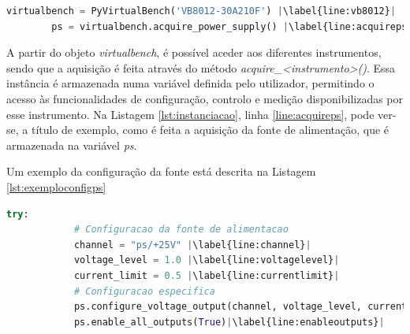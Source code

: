 \begin{center}
\begin{minipage}{0.9\linewidth}
	\begin{lstlisting}[language=Python,escapechar=|, caption=Instanciação da classe \textit{PyVirtualBench}, label=lst:instanciacao]
		virtualbench = PyVirtualBench('VB8012-30A210F') |\label{line:vb8012}|
		ps = virtualbench.acquire_power_supply() |\label{line:acquireps}|
	\end{lstlisting}
\end{minipage}
\end{center}

A partir do objeto \textit{virtualbench}, é possível aceder aos diferentes instrumentos, sendo que a aquisição é feita através do método \textit{acquire\_\textless instrumento\textgreater()}. Essa instância é armazenada numa variável definida pelo utilizador, permitindo o acesso às funcionalidades de configuração, controlo e medição disponibilizadas por esse instrumento. Na Listagem \ref{lst:instanciacao}, linha \ref{line:acquireps}, pode ver-se, a título de exemplo, como é feita a aquisição da fonte de alimentação, que é armazenada na variável \textit{ps}.

Um exemplo da configuração da fonte está descrita na Listagem \ref{lst:exemploconfigps}

\begin{minipage}{0.7\linewidth}
	\begin{lstlisting}[language=Python,escapechar=|, caption=Exemplo \textit{ps\_example.py}, label=lst:exemploconfigps]
		try:
			# Configuracao da fonte de alimentacao
			channel = "ps/+25V" |\label{line:channel}| 
			voltage_level = 1.0 |\label{line:voltagelevel}|
			current_limit = 0.5 |\label{line:currentlimit}|
			# Configuracao especifica
			ps.configure_voltage_output(channel, voltage_level, current_limit)|\label{line:configvoltage}|
			ps.enable_all_outputs(True)|\label{line:enableoutputs}|
	\end{lstlisting}
\end{minipage}

